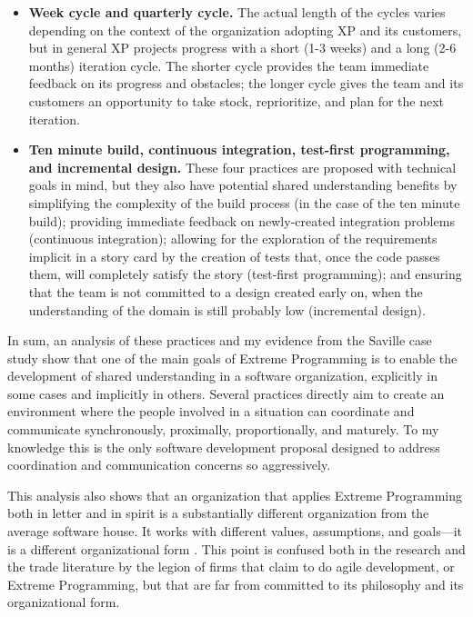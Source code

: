 \begin{itemize}
\item \textbf{Week cycle and quarterly cycle.} The actual length of the cycles varies depending on the context of the organization adopting XP and its customers, but in general XP projects progress with a short (1-3 weeks) and a long (2-6 months) iteration cycle. The shorter cycle provides the team immediate feedback on its progress and obstacles; the longer cycle gives the team and its customers an opportunity to take stock, reprioritize, and plan for the next iteration.

\item \textbf{Ten minute build, continuous integration, test-first programming, and incremental design.} These four practices are proposed with technical goals in mind, but they also have potential shared understanding benefits by simplifying the complexity of the build process (in the case of the ten minute build); providing immediate feedback on newly-created integration problems (continuous integration); allowing for the exploration of the requirements implicit in a story card by the creation of tests that, once the code passes them, will completely satisfy the story (test-first programming); and ensuring that the team is not committed to a design created early on, when the understanding of the domain is still probably low (incremental design).
\end{itemize}

In sum, an analysis of these practices and my evidence from the Saville case study show that one of the main goals of Extreme Programming is to enable the development of shared understanding in a software organization, explicitly in some cases and implicitly in others. Several practices directly aim to create an environment where the people involved in a situation can coordinate and communicate synchronously, proximally, proportionally, and maturely. To my knowledge this is the only software development proposal designed to address coordination and communication concerns so aggressively.

This analysis also shows that an organization that applies Extreme Programming both in letter and in spirit is a substantially different organization from the average software house. It works with different values, assumptions, and goals---it is a different organizational form \cite{Stinchcombe1965}. This point is confused both in the research and the trade literature by the legion of firms that claim to do agile development, or Extreme Programming, but that are far from committed to its philosophy and its organizational form.


